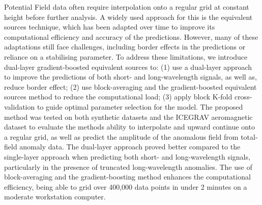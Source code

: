 Potential Field data often require interpolation onto a regular grid at constant height before further analysis. A widely used approach for this is the equivalent sources technique, which has been adapted over time to improve its computational efficiency and accuracy of the predictions. However, many of these adaptations still face challenges, including border effects in the predictions or reliance on a stabilising parameter. To address these limitations, we introduce dual-layer gradient-boosted equivalent sources to: (1) use a dual-layer approach to improve the predictions of both short- and long-wavelength signals, as well as, reduce border effect; (2) use block-averaging and the gradient-boosted equivalent sources method to reduce the computational load; (3) apply block K-fold cross-validation to guide optimal parameter selection for the model. The proposed method was tested on both synthetic datasets and the ICEGRAV aeromagnetic dataset to evaluate the methods ability to interpolate and upward continue onto a regular grid, as well as predict the amplitude of the anomalous field from total-field anomaly data. The dual-layer approach proved better compared to the single-layer approach when predicting both short- and long-wavelength signals, particularly in the presence of truncated long-wavelength anomalies. The use of block-averaging and the gradient-boosting method enhances the computational efficiency, being able to grid over 400,000 data points in under 2 minutes on a moderate workstation computer.